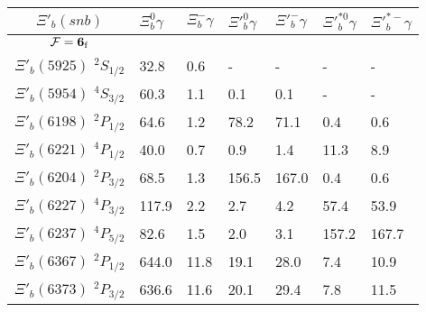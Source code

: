 \begin{tabular}{c |  p{0.65cm}  p{0.65cm}  p{0.65cm}  p{0.65cm}  p{0.65cm}  p{0.65cm}} \hline \hline
$\Xi'_b(snb)$  & $\Xi_{b}^{0} \gamma$  & $\Xi_{b}^{-} \gamma$  & $\Xi'^{0}_{b} \gamma$  & $\Xi'^{-}_{b} \gamma$  & $\Xi'^{*0}_{b} \gamma$  & $\Xi'^{*-}_{b} \gamma$  \\ \hline
$\mathcal{F}={\bf {6}}_{\rm f}$ &&&&&&\\ \hline
$\Xi'_b(5925)$ $^{2}S_{1/2}$&32.8  &0.6  &-  &-  &-  &- \\
$\Xi'_b(5954)$ $^{4}S_{3/2}$&60.3  &1.1  &0.1  &0.1  &-  &- \\
$\Xi'_b(6198)$ $^{2}P_{1/2}$&64.6  &1.2  &78.2  &71.1  &0.4  &0.6 \\
$\Xi'_b(6221)$ $^{4}P_{1/2}$&40.0  &0.7  &0.9  &1.4  &11.3  &8.9 \\
$\Xi'_b(6204)$ $^{2}P_{3/2}$&68.5  &1.3  &156.5  &167.0  &0.4  &0.6 \\
$\Xi'_b(6227)$ $^{4}P_{3/2}$&117.9  &2.2  &2.7  &4.2  &57.4  &53.9 \\
$\Xi'_b(6237)$ $^{4}P_{5/2}$&82.6  &1.5  &2.0  &3.1  &157.2  &167.7 \\
$\Xi'_b(6367)$ $^{2}P_{1/2}$&644.0  &11.8  &19.1  &28.0  &7.4  &10.9 \\
$\Xi'_b(6373)$ $^{2}P_{3/2}$&636.6  &11.6  &20.1  &29.4  &7.8  &11.5 \\
\hline \hline
\end{tabular}
